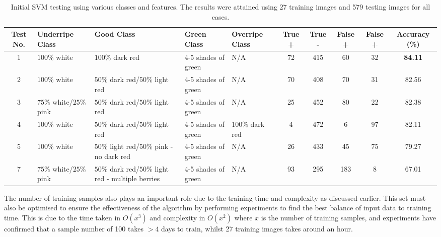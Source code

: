 \documentclass[fleqn,twoside,12pt]{report}
\begin{document}
\begin{table} 
	\centering
	\caption{Initial SVM testing using various classes and features. The results were attained using 27 training images and 579 testing images for all cases.}
	\label{tab:svm_results}
	\begin{tabular}{cp{2.5cm}p{2.5cm}p{2.5cm}p{2.5cm}ccccc}
		\toprule
		\textbf{Test No.} & 		\textbf{Underripe Class} & \textbf{Good Class} & \textbf{Green Class} & \textbf{Overripe Class} & \textbf{True +} & \textbf{True -} & \textbf{False +} & 		\textbf{False +} & 		\textbf{Accuracy (\%)} \tabularnewline
		\midrule
		
		 1 & 
		 $100\%$ white & 
		 $100\%$ dark red &
		 4-5 shades of green & N/A & 72 & 415 & 60 & 32 &   \textbf{84.11}\\
		\midrule

		 2 & 
		 $100\%$ white & 
		 $50\%$ dark red/$50\%$ light red &
		 4-5 shades of green & N/A & 70 & 408 & 70 & 31 & 82.56\\
		\midrule
				
		 3 & 
		 $75\%$ white/$25\%$ pink & 
		 $50\%$ dark red/$50\%$ light red &
		 4-5 shades of green &
		 N/A & 25 & 452 & 80 & 22 & 82.38\\
		 \midrule
		
		 4 & 
		 $100\%$ white & 
		 $50\%$ dark red/$50\%$ light red&
		 4-5 shades of green &
		 $100\%$ dark red & 4 & 472 & 6 & 97 & 82.11\\
		\midrule

		 5 & 
		 $100\%$ white & 
		 $50\%$ light red/$50\%$ pink - no dark red &
		 4-5 shades of green & N/A & 26 & 433 & 45 & 75 & 79.27\\
		\midrule

		 7 & 
		 $75\%$ white/$25\%$ pink & 
		 $50\%$ dark red/$50\%$ light red - multiple berries &
		 4-5 shades of green & N/A & 93 & 295 & 183 & 8 & 67.01\\
		\bottomrule
	\end{tabular}
\end{table} 


The number of training samples also plays an important role due to the training time and complexity as discussed earlier. This set must also be optimised to ensure the effectiveness of the algorithm by performing experiments to find the best balance of input data to training time. This is due to the time taken in $O(x^3)$ and complexity in $O(x^2)$ where $x$ is the number of training samples, and experiments have confirmed that a sample number of 100 takes $>4$ days to train, whilst 27 training images takes around an hour.  
\end{document}
